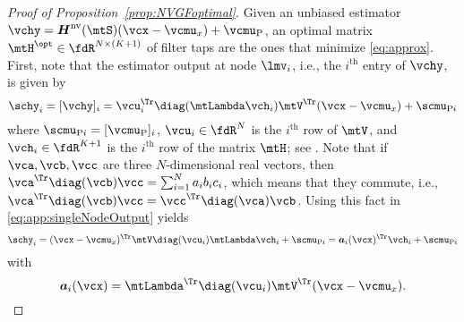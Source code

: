 \begin{proof}[Proof of Proposition~\ref{prop:NVGFoptimal}]
Given an unbiased estimator $\vchy = \mtfnH^{\text{nv}}(\mtS) ( \vcx - \vcmu_{x}) + \vcmu_{\rho}$, an optimal matrix $\mtH^{\opt} \in \fdR^{N \times (K+1)}$ of filter taps are the ones that minimize \eqref{eq:approx}. First, note that the estimator output at node $\lmv_{i}$, i.e., the $i^{\text{th}}$ entry of $\vchy$, is given by
\begin{equation} \label{eq:app:singleNodeOutput}
    \schy_{i} = [\vchy]_{i} = \vcu_{i}^{\Tr} \diag( \mtLambda \vch_{i}) \mtV^{\Tr} (\vcx-\vcmu_{x}) + \scmu_{\rho i}
\end{equation}
%
where $\scmu_{\rho i} = [\vcmu_{\rho}]_{i}$, $\vcu_{i} \in \fdR^{N}$ is the $i^{\text{th}}$ row of $\mtV$, and $\vch_{i} \in \fdR^{K+1}$ is the $i^{\text{th}}$ row of the matrix $\mtH$; see \cite{Segarra2017-GraphFilterDesign}. Note that if $\vca, \vcb, \vcc$ are three $N$-dimensional real vectors, then $\vca^{\Tr} \diag(\vcb) \vcc = \sum_{i=1}^{N} a_{i}b_{i}c_{i}$, which means that they commute, i.e., $\vca^{\Tr} \diag(\vcb) \vcc = \vcc^{\Tr} \diag(\vca) \vcb$. Using this fact in \eqref{eq:app:singleNodeOutput} yields
\begin{equation} \label{eq:app:singleNodeWithA}
    \schy_{i} = (\vcx - \vcmu_{x})^{\Tr} \mtV \diag(\vcu_{i}) \mtLambda \vch_{i} + \scmu_{\rho i} = \vcfna_{i}(\vcx)^{\Tr} \vch_{i} + \scmu_{\rho i}
\end{equation}
%
with
%
\begin{equation*}
    \vcfna_{i}(\vcx) = \mtLambda^{\Tr} \diag(\vcu_{i}) \mtV^{\Tr} (\vcx - \vcmu_{x}).
\end{equation*}
%


\end{proof}
